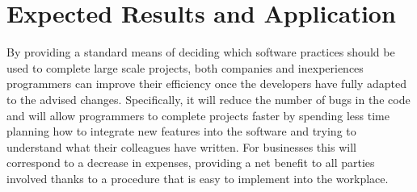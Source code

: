 \documentclass[12pt, letterpaper]{article}
\begin{document}
\section{Expected Results and Application}
  By providing a standard means of deciding which software practices should be used to complete large scale projects, both companies and inexperiences programmers can improve their efficiency once
  the developers have fully adapted to the advised changes. Specifically, it will reduce the number of bugs in the code and will allow programmers to complete projects faster by spending less time
  planning how to integrate new features into the software and trying to understand what their colleagues have written. For businesses this will correspond to a decrease in expenses, providing a net
  benefit to all parties involved thanks to a procedure that is easy to implement into the workplace.
\end{document}
